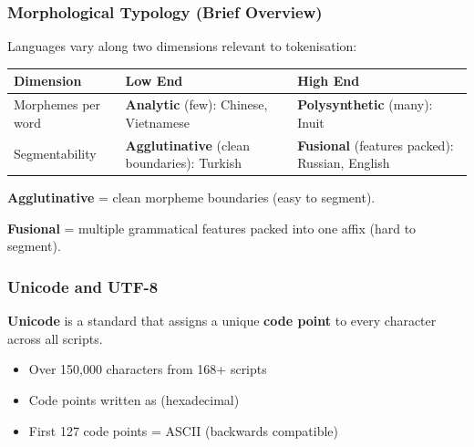 \separator

\subsubsection{Morphological Typology (Brief Overview)}

Languages vary along two dimensions relevant to tokenisation:

\begin{center}
\renewcommand{\arraystretch}{1.3}
\begin{tabular}{@{} l p{5.5cm} p{5.5cm} @{}}
\toprule
\textbf{Dimension} & \textbf{Low End} & \textbf{High End} \\
\midrule
Morphemes per word & \textbf{Analytic} (few): Chinese, Vietnamese & \textbf{Polysynthetic} (many): Inuit \\
Segmentability & \textbf{Agglutinative} (clean boundaries): Turkish & \textbf{Fusional} (features packed): Russian, English \\
\bottomrule
\end{tabular}
\end{center}

\begin{tipbox}
\textbf{Agglutinative} = clean morpheme boundaries (easy to segment).

\textbf{Fusional} = multiple grammatical features packed into one affix (hard to segment).
\end{tipbox}

\bigseparator

\subsubsection{Unicode and UTF-8}

\begin{defbox}[Unicode]
\textbf{Unicode} is a standard that assigns a unique \textbf{code point} to every character across all scripts.

\begin{itemize}
  \item Over 150,000 characters from 168+ scripts
  \item Code points written as  (hexadecimal)
  \item First 127 code points = ASCII (backwards compatible)
\end{itemize}
\end{defbox}

